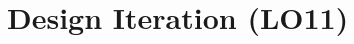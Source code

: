 \documentclass[12pt,titlepage]{article}
\begin{document}





\section{Design Iteration (LO11)}
\end{document}
